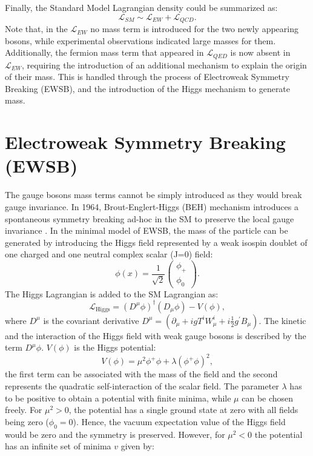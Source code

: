 Finally, the Standard Model Lagrangian density could be summarized as: 
\begin{equation}
    \mathcal{L}_{SM} \sim \mathcal{L}_{EW} + \mathcal{L}_{QCD}.
\end{equation}
Note that, in the $\mathcal{L}_{EW}$ no mass term is introduced for the two newly appearing bosons, while experimental observations indicated large masses for them. Additionally, the fermion mass term that appeared in $\mathcal{L}_{QED}$ is now absent in $\mathcal{L}_{EW}$, requiring the introduction of an additional mechanism to explain the origin of their mass. This is handled through the process of Electroweak Symmetry Breaking (EWSB), and the introduction of the Higgs mechanism to generate mass.

\section{Electroweak Symmetry Breaking (EWSB)}
\label{chap1:EWSB}
The gauge bosons mass terms cannot be simply introduced as they would break gauge invariance. In 1964, Brout-Englert-Higgs (BEH) mechanism introduces a spontaneous symmetry breaking ad-hoc in the SM to preserve the local gauge invariance \cite{Englert}. In the minimal model of EWSB, the mass of the particle can be generated by introducing the Higgs field represented by a weak isospin doublet of one charged and one neutral complex scalar (J=0) field:
\begin{equation}
    \phi(x)=\frac{1}{\sqrt{2}}\left(\begin{array}{c}
\phi_{+} \\
\phi_{0}
\end{array}\right).
\end{equation}
The Higgs Lagrangian is added to the SM Lagrangian as:
\begin{equation}
    \mathcal{L}_{\mathrm{Higgs}}=\left(D^{\mu} \phi\right)^{\dagger}\left(D_{\mu} \phi\right)-V(\phi),
\end{equation}
where $D^\mu$ is the covariant derivative $D^\mu =\left(\partial_{\mu}+i g T^{i} W_{\mu}^{i}+i \frac{1}{2} g^{\prime} B_{\mu}\right)$. The kinetic and the interaction of the Higgs field with weak gauge bosons is described by the term $D^\mu\phi$. $V(\phi)$ is the Higgs potential:
\begin{equation}
    V(\phi)=\mu^{2} \phi^{+} \phi+\lambda\left(\phi^{+} \phi\right)^{2},
\end{equation}
the first term can be associated with the mass of the field and the second represents the quadratic self-interaction of the scalar field. The parameter $\lambda$ has to be positive to obtain a potential with finite minima, while $\mu$ can be chosen freely. For $\mu^{2} > 0$, the potential has a single ground state at zero with all fields being zero ($\phi_0 = 0$). Hence, the vacuum expectation value of the Higgs field would be zero and the symmetry is preserved. However, for $\mu^{2} < 0$ the potential has an infinite set of minima $v$ given by:

